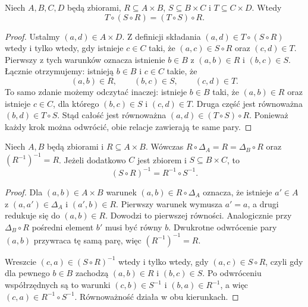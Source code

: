 \begin{twierdzenie}\label{thm:relation-assoc}
Niech $A,B,C,D$ będą zbiorami, $R\subseteq A\times B$,
$S\subseteq B\times C$ i $T\subseteq C\times D$. Wtedy
\[
T\circ(S\circ R)=(T\circ S)\circ R.
\]
\end{twierdzenie}
\begin{proof}
Ustalmy $(a,d)\in A\times D$.
Z definicji składania $(a,d)\in T\circ(S\circ R)$
wtedy i tylko wtedy, gdy istnieje $c\in C$ taki, że
$(a,c)\in S\circ R$ oraz $(c,d)\in T$.
Pierwszy z tych warunków oznacza istnienie $b\in B$
z $(a,b)\in R$ i $(b,c)\in S$. Łącznie otrzymujemy:
istnieją $b\in B$ i $c\in C$ takie, że
\[
(a,b)\in R,\qquad (b,c)\in S,\qquad (c,d)\in T.
\]
To samo zdanie możemy odczytać inaczej: istnieje $b\in B$
taki, że $(a,b)\in R$ oraz istnieje $c\in C$,
dla którego $(b,c)\in S$ i $(c,d)\in T$.
Druga część jest równoważna $(b,d)\in T\circ S$.
Stąd całość jest równoważna
$(a,d)\in(T\circ S)\circ R$.
Ponieważ każdy krok można odwrócić, obie relacje zawierają
te same pary.
\end{proof}

\begin{twierdzenie}
\label{thm:relation-identities}
Niech $A,B$ będą zbiorami i $R\subseteq A\times B$.
Wówczas $R\circ\Delta_A=R=\Delta_B\circ R$ oraz
$(R^{-1})^{-1}=R$.
Jeżeli dodatkowo $C$ jest zbiorem i $S\subseteq B\times C$, to
\[
(S\circ R)^{-1}=R^{-1}\circ S^{-1}.
\]
\end{twierdzenie}
\begin{proof}
Dla $(a,b)\in A\times B$ warunek
$(a,b)\in R\circ\Delta_A$ oznacza, że istnieje
$a'\in A$ z $(a,a')\in\Delta_A$ i $(a',b)\in R$.
Pierwszy warunek wymusza $a'=a$, a drugi redukuje się do
$(a,b)\in R$. Dowodzi to pierwszej równości.
Analogicznie przy $\Delta_B\circ R$ pośredni element
$b'$ musi być równy $b$. Dwukrotne odwrócenie pary
$(a,b)$ przywraca tę samą parę, więc $(R^{-1})^{-1}=R$.

Wreszcie $(c,a)\in(S\circ R)^{-1}$
wtedy i tylko wtedy, gdy $(a,c)\in S\circ R$,
czyli gdy dla pewnego $b\in B$ zachodzą
$(a,b)\in R$ i $(b,c)\in S$.
Po odwróceniu współrzędnych są to warunki
$(c,b)\in S^{-1}$ i $(b,a)\in R^{-1}$,
a więc $(c,a)\in R^{-1}\circ S^{-1}$.
Równoważność działa w obu kierunkach.
\end{proof}


